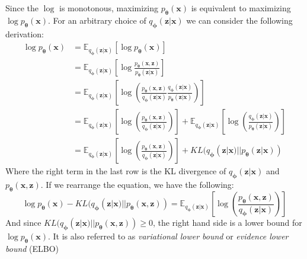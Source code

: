 \documentclass[12pt]{report}
\theoremstyle{definition}
\begin{document}
Since the $\log$ is monotonous, maximizing $p_{\mathbf{\theta}}(\mathbf{x})$ is equivalent to maximizing $\log p_{\mathbf{\theta}}(\mathbf{x})$. For an arbitrary choice of $q_{\mathbf{\phi}}(\mathbf{z}|\mathbf{x})$ we can consider the following derivation:
\begin{equation}
\begin{split}
	\log p_{\mathbf{\theta}}(\mathbf{x}) 
	& = \mathbb{E}_{q_{\mathbf{\phi}}(\mathbf{z}|\mathbf{x})}\left[\log p_{\mathbf{\theta}}(\mathbf{x})\right] \\
	& = \mathbb{E}_{q_{\mathbf{\phi}}(\mathbf{z}|\mathbf{x})}\left[ \log \frac{p_{\mathbf{\theta}}(\mathbf{x}, \mathbf{z})}{p_{\mathbf{\theta}}(\mathbf{z}|\mathbf{x})} \right] \\
	& = \mathbb{E}_{q_{\mathbf{\phi}}(\mathbf{z}|\mathbf{x})}\left[ \log\left(\frac{p_{\mathbf{\theta}}(\mathbf{x}, \mathbf{z})}{q_{\mathbf{\phi}}(\mathbf{z}|\mathbf{x})}\frac{q_{\mathbf{\phi}}(\mathbf{z}|\mathbf{x})}{p_{\mathbf{\theta}}(\mathbf{z}|\mathbf{x})} \right) \right] \\
	& = \mathbb{E}_{q_{\mathbf{\phi}}(\mathbf{z}|\mathbf{x})}\left[ \log\left(\frac{p_{\mathbf{\theta}}(\mathbf{x}, \mathbf{z})}{q_{\mathbf{\phi}}(\mathbf{z}|\mathbf{x})}\right) \right] + \mathbb{E}_{q_{\mathbf{\phi}}(\mathbf{z}|\mathbf{x})}\left[ \log\left(\frac{q_{\mathbf{\phi}}(\mathbf{z}|\mathbf{x})}{p_{\mathbf{\theta}}(\mathbf{z}|\mathbf{x})} \right) \right] \\
	& = \mathbb{E}_{q_{\mathbf{\phi}}(\mathbf{z}|\mathbf{x})}\left[ \log\left(\frac{p_{\mathbf{\theta}}(\mathbf{x}, \mathbf{z})}{q_{\mathbf{\phi}}(\mathbf{z}|\mathbf{x})}\right) \right] + KL(q_{\mathbf{\phi}}(\mathbf{z}|\mathbf{x}) || p_{\mathbf{\theta}}(\mathbf{z}| \mathbf{x})) 
\end{split}
\end{equation}
Where the right term in the last row is the KL divergence of $q_{\mathbf{\phi}}(\mathbf{z}|\mathbf{x})$ and $p_{\mathbf{\theta}}(\mathbf{x}, \mathbf{z})$. If we rearrange the equation, we have the following:
\begin{equation}
	\log p_{\mathbf{\theta}}(\mathbf{x}) - KL(q_{\mathbf{\phi}}(\mathbf{z}|\mathbf{x}) || p_{\mathbf{\theta}}(\mathbf{x}, \mathbf{z})) = \mathbb{E}_{q_{\mathbf{\phi}}(\mathbf{z}|\mathbf{x})}\left[ \log\left(\frac{p_{\mathbf{\theta}}(\mathbf{x}, \mathbf{z})}{q_{\mathbf{\phi}}(\mathbf{z}|\mathbf{x})}\right) \right]
\end{equation}
	And since $KL(q_{\mathbf{\phi}}(\mathbf{z}|\mathbf{x}) || p_{\mathbf{\theta}}(\mathbf{x}, \mathbf{z})) \geq 0$, the right hand side is a lower bound for $\log p_{\mathbf{\theta}}(\mathbf{x})$. It is also referred to as \emph{variational lower bound} or \emph{evidence lower bound} (ELBO) 
\end{document}
